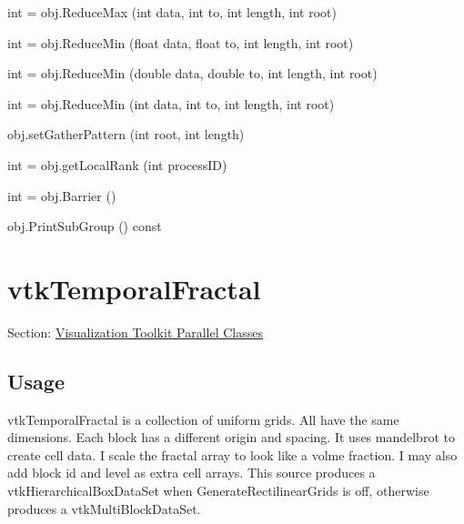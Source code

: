 \begin{DoxyItemize}
\item {\ttfamily int = obj.\-Reduce\-Max (int data, int to, int length, int root)}  
\item {\ttfamily int = obj.\-Reduce\-Min (float data, float to, int length, int root)}  
\item {\ttfamily int = obj.\-Reduce\-Min (double data, double to, int length, int root)}  
\item {\ttfamily int = obj.\-Reduce\-Min (int data, int to, int length, int root)}  
\item {\ttfamily obj.\-set\-Gather\-Pattern (int root, int length)}  
\item {\ttfamily int = obj.\-get\-Local\-Rank (int process\-I\-D)}  
\item {\ttfamily int = obj.\-Barrier ()}  
\item {\ttfamily obj.\-Print\-Sub\-Group () const}  
\end{DoxyItemize}\hypertarget{vtkparallel_vtktemporalfractal}{}\section{vtk\-Temporal\-Fractal}\label{vtkparallel_vtktemporalfractal}
Section\-: \hyperlink{sec_vtkparallel}{Visualization Toolkit Parallel Classes} \hypertarget{vtkwidgets_vtkxyplotwidget_Usage}{}\subsection{Usage}\label{vtkwidgets_vtkxyplotwidget_Usage}
vtk\-Temporal\-Fractal is a collection of uniform grids. All have the same dimensions. Each block has a different origin and spacing. It uses mandelbrot to create cell data. I scale the fractal array to look like a volme fraction. I may also add block id and level as extra cell arrays. This source produces a vtk\-Hierarchical\-Box\-Data\-Set when Generate\-Rectilinear\-Grids is off, otherwise produces a vtk\-Multi\-Block\-Data\-Set.

